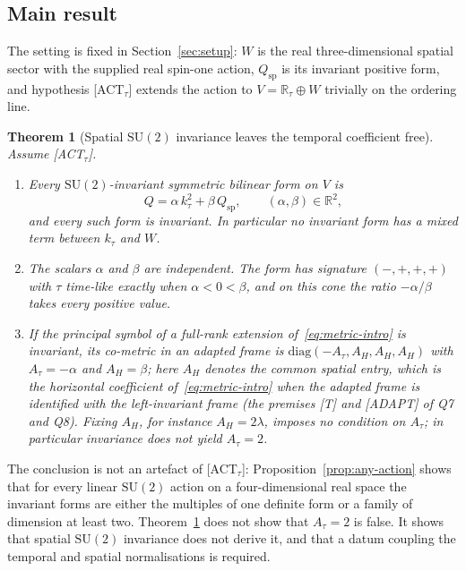 \documentclass[12pt,a4paper]{article}
\newtheorem{theorem}{Theorem}[section]
\newcommand{\SU}{\mathrm{SU}}
\newcommand{\Qsp}{Q_{\mathrm{sp}}}
\newcommand{\Rtau}{\mathbb{R}_\tau}
\begin{document}
    \subsection{Main result}

      The setting is fixed in Section~\ref{sec:setup}: $W$ is the real three-dimensional spatial sector with the
      supplied real spin-one action, $\Qsp$ is its invariant positive form, and hypothesis [ACT$_\tau$] extends the
      action to $V = \Rtau\oplus W$ trivially on the ordering line.

      \begin{theorem}[Spatial $\SU(2)$ invariance leaves the temporal coefficient free]
        \label{thm:main}
        Assume \textup{[ACT$_\tau$]}.
        \begin{enumerate}
          \item[(a)] Every $\SU(2)$-invariant symmetric bilinear form on $V$ is
          \[
            Q = \alpha\,k_\tau^2 + \beta\,\Qsp,
            \qquad (\alpha,\beta)\in\mathbb{R}^2,
          \]
          and every such form is invariant.
          In particular no invariant form has a mixed term between $k_\tau$ and $W$.
          \item[(b)] The scalars $\alpha$ and $\beta$ are independent.
          The form has signature $(-,+,+,+)$ with $\tau$ time-like exactly when $\alpha < 0 < \beta$, and on this
          cone the ratio
          $-\alpha/\beta$ takes every positive value.
          \item[(c)] If the principal symbol of a full-rank extension of~\eqref{eq:metric-intro} is invariant, its
          co-metric in an adapted frame is $\mathrm{diag}(-A_\tau, A_H, A_H, A_H)$ with $A_\tau = -\alpha$ and
          $A_H = \beta$; here $A_H$ denotes the common spatial entry, which is the horizontal coefficient
          of~\eqref{eq:metric-intro} when the adapted frame is identified with the left-invariant frame
          (the premises [T] and [ADAPT] of Q7 and Q8).
          Fixing $A_H$, for instance $A_H = 2\lambda$, imposes no condition on $A_\tau$; in particular invariance
          does not yield $A_\tau = 2$.
        \end{enumerate}
      \end{theorem}

      The conclusion is not an artefact of [ACT$_\tau$]: Proposition~\ref{prop:any-action} shows that for every linear
      $\SU(2)$ action on a four-dimensional real space the invariant forms are either the multiples of one definite
      form or a family of dimension at least two.
      Theorem~\ref{thm:main} does not show that $A_\tau = 2$ is false.
      It shows that spatial $\SU(2)$ invariance does not derive it, and that a datum coupling the temporal and spatial
      normalisations is required.
\end{document}
